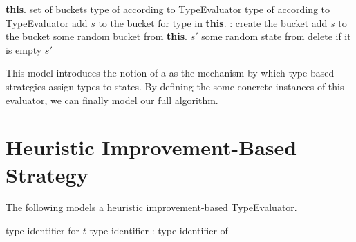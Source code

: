 

\begin{algorithmic}[1]
        \State \textbf{this}. \ceq \New set of buckets
    \EndFunction
        \State {} \ceq type of  according to TypeEvaluator
        \State {} \ceq type of  according to TypeEvaluator
            \State add $s$ to the bucket for type  in \textbf{this}.
        \Else:
                \State create the bucket
            \EndIf
            \State add $s$ to the bucket
        \EndIf
    \EndFunction
        \State {} \ceq some random bucket from \textbf{this}.
        \State $s'$ \ceq some random state from 
        \State delete  if it is empty
        \State \Return $s'$
    \EndFunction
\end{algorithmic}

This model introduces the notion of a  as the mechanism by which type-based strategies assign types to states. By defining the some concrete instances of this evaluator, we can finally model our full algorithm.

\section{Heuristic Improvement-Based Strategy}

The following models a heuristic improvement-based TypeEvaluator.

\begin{algorithmic}[1]
                \State \Return type identifier for $t$
            \Else
                \State \Return \New type identifier
            \EndIf
        \Else:
            \State \Return type identifier of 
        \EndIf
    \EndFunction
\end{algorithmic}

